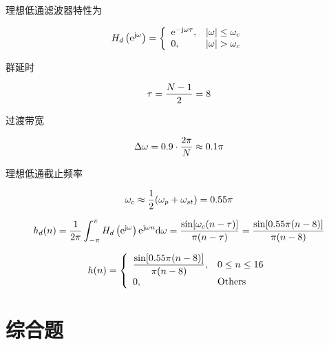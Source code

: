\documentclass[cn, hazy, blue, normal, 12pt]{elegantnote}
\begin{document}
\begin{solution}[print=true]

理想低通滤波器特性为

\begin{equation}
\notag
    H_d\left(\text{e}^{\text{j}\omega}\right)=\left\{
    \begin{array}{ll}
        \text{e}^{-\text{j}\omega\tau}, & |\omega|\leq\omega_c \\
        0, & |\omega|>\omega_c
    \end{array}
    \right.
\end{equation}

群延时

\begin{equation}
\notag
    \tau=\frac{N-1}{2}=8
\end{equation}

过渡带宽

\begin{equation}
\notag
    \Delta\omega=0.9\cdot\frac{2\pi}{N}\approx 0.1\pi
\end{equation}

理想低通截止频率

\begin{equation}
\notag
    \omega_c\approx\frac{1}{2}(\omega_p+\omega_{st})=0.55\pi
\end{equation}

\begin{equation}
\notag
    h_d(n)=\frac{1}{2\pi}\int_{-\pi}^{\pi}H_d\left(\text{e}^{\text{j}\omega}\right)\text{e}^{\text{j}\omega n}\text{d}\omega=\frac{\sin[\omega_c(n-\tau)]}{\pi(n-\tau)}=\frac{\sin[0.55\pi(n-8)]}{\pi(n-8)}
\end{equation}

\begin{equation}
\notag
    h(n)=\left\{
    \begin{array}{ll}
        \dfrac{\sin[0.55\pi(n-8)]}{\pi(n-8)}, & 0\leq n\leq 16 \\
        0, & \text{Others}
    \end{array}
    \right.
\end{equation}

\end{solution}


\section{综合题}
\end{document}

